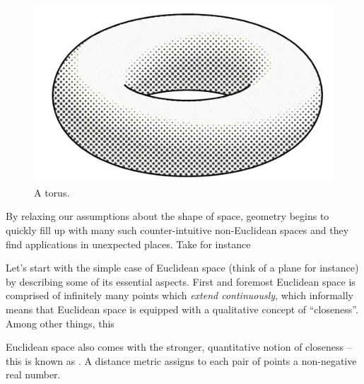\begin{figure}
	\centering
	\includegraphics[scale=0.3]{graphics/diagrams/torus_non_vanishing_vector_field/result.jpg}
	\vspace{1em}
	\caption{A torus.}
\end{figure}

By relaxing our assumptions about the shape of space, geometry begins to quickly fill up with many such counter-intuitive non-Euclidean spaces and they find applications in unexpected places. Take for instance 

\hspace{1em}

Let's start with the simple case of Euclidean space (think of a plane for instance) by describing some of its essential aspects. First and foremost Euclidean space is comprised of infinitely many points which \emph{extend continuously}, which informally means that Euclidean space is equipped with a qualitative concept of ``closeness''. Among other things, this 

Euclidean space also comes with the stronger, quantitative notion of closeness -- this is known as . A distance metric assigns to each pair of points a non-negative real number.


%
%
%
%
%
%

